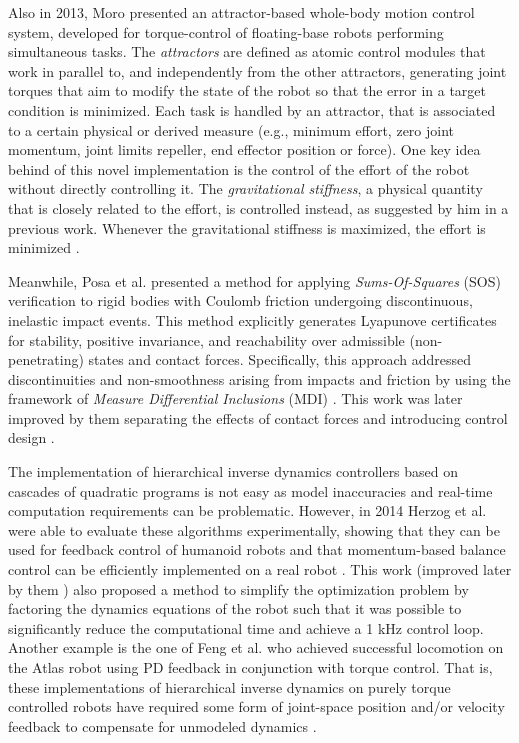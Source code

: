 	Also in 2013, Moro \cite{Moro_Humanoids2013} \cite{Moro_IJHR2016} presented an attractor-based
	whole-body motion control	system, developed for	torque-control of floating-base robots performing
	simultaneous tasks.
	The \emph{attractors} are defined as atomic control modules that work in parallel to, and independently
	from the other attractors, generating joint torques that aim to modify the state of the robot so 
	that the error in a target condition is minimized.
	Each task is handled by an attractor, that is associated to a certain physical or derived measure
	(e.g., minimum effort, zero joint momentum, joint limits repeller, end effector position or force).
	One key idea behind of this novel implementation is the control of the effort of the robot without
	directly controlling it.
	The \emph{gravitational stiffness}, a physical quantity that is closely related to the effort,
	is controlled instead, as suggested by him \cite{Moro_Humanoids2015} in a previous work.
	Whenever the gravitational stiffness is maximized, the effort is minimized \cite{Moro_IJHR2016}.
	
	Meanwhile, Posa et al. \cite{Posa_HSCC2013} presented a method for applying \emph{Sums-Of-Squares} (SOS)
	verification to rigid bodies with Coulomb friction undergoing discontinuous, inelastic impact events.
	This method explicitly generates Lyapunove certificates for stability, positive invariance, and
	reachability over admissible (non-penetrating) states and contact forces.
	Specifically, this approach addressed discontinuities and non-smoothness arising from impacts and friction 
	by using the framework of \emph{Measure Differential Inclusions} (MDI) \cite{Posa_HSCC2013}.
	This work was later improved by them \cite{Posa_TransAutoControl2016} separating the effects of contact
	forces and introducing control design \cite{Posa_TransAutoControl2016}.
	
	The implementation of hierarchical inverse dynamics controllers based on cascades of quadratic programs
	is not easy as model inaccuracies and real-time computation requirements can be problematic.
	However, in 2014 Herzog et al. \cite{Herzog_IROS2014} were able to evaluate these algorithms experimentally,
	showing that they can be used for feedback control of humanoid robots and that momentum-based
	balance control can be efficiently implemented on a real robot \cite{Herzog_IROS2014}.
	This work (improved later by them \cite{Herzog_Humanoids2015} \cite{Herzog_AutoRobots2016}) also proposed a
	method to simplify the optimization problem by factoring the dynamics equations	of the robot such that it was
	possible to	significantly reduce the computational time and achieve a 1 kHz control loop.
	Another example is the one of Feng et al. \cite{Feng_Humanoids2014} who achieved successful locomotion on
	the Atlas robot using PD feedback in conjunction with torque control.
	That is, these implementations of hierarchical inverse dynamics on purely torque controlled robots have
	required some form of joint-space position and/or velocity feedback to compensate for unmodeled dynamics
	\cite{Hopkins_ICRA2015}.
	
